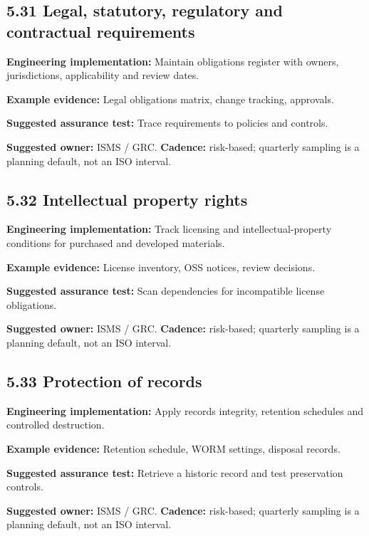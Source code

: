 \documentclass[11pt,letterpaper]{article}
\begin{document}
\subsection{5.31 Legal, statutory, regulatory and contractual requirements}
\textbf{Engineering implementation:} Maintain obligations register with owners, jurisdictions, applicability and review dates.\par
\textbf{Example evidence:} Legal obligations matrix, change tracking, approvals.\par
\textbf{Suggested assurance test:} Trace requirements to policies and controls.\par
\textbf{Suggested owner:} ISMS / GRC. \textbf{Cadence:} risk-based; quarterly sampling is a planning default, not an ISO interval.\par
{}
\subsection{5.32 Intellectual property rights}
\textbf{Engineering implementation:} Track licensing and intellectual-property conditions for purchased and developed materials.\par
\textbf{Example evidence:} License inventory, OSS notices, review decisions.\par
\textbf{Suggested assurance test:} Scan dependencies for incompatible license obligations.\par
\textbf{Suggested owner:} ISMS / GRC. \textbf{Cadence:} risk-based; quarterly sampling is a planning default, not an ISO interval.\par
{}
\subsection{5.33 Protection of records}
\textbf{Engineering implementation:} Apply records integrity, retention schedules and controlled destruction.\par
\textbf{Example evidence:} Retention schedule, WORM settings, disposal records.\par
\textbf{Suggested assurance test:} Retrieve a historic record and test preservation controls.\par
\textbf{Suggested owner:} ISMS / GRC. \textbf{Cadence:} risk-based; quarterly sampling is a planning default, not an ISO interval.\par
{}
\end{document}
